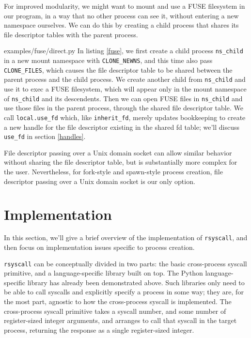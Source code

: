 \documentclass[letterpaper,twocolumn,10pt]{article}
\begin{document}
For improved modularity, we might want to mount and use a FUSE filesystem in our program,
in a way that no other process can see it,
without entering a new namespace ourselves.
We can do this by creating a child process that shares its file descriptor tables with the parent process.


{examples/fuse/direct.py}
In listing \ref{fuse},
we first create a child process \verb|ns_child| in a new mount namespace with \verb|CLONE_NEWNS|,
and this time also pass \verb|CLONE_FILES|,
which causes the file descriptor table to be shared between the parent process and the child process.\cite{clone}
We create another child from \verb|ns_child|
and use it to exec a FUSE filesystem,
which will appear only in the mount namespace of \verb|ns_child| and its descendents.
Then we can open FUSE files in \verb|ns_child|
and use those files in the parent process,
through the shared file descriptor table.
We call \texttt{local.use\_fd} which, like \texttt{inherit\_fd},
merely updates bookkeeping to create a new handle for the file descriptor existing in the shared fd table;
we'll discuss \texttt{use\_fd} in section \ref{handles}.

File descriptor passing over a Unix domain socket
can allow similar behavior without sharing the file descriptor table,
but is substantially more complex for the user.
Nevertheless, for fork-style and spawn-style process creation,
file descriptor passing over a Unix domain socket
is our only option.
\section{Implementation}\label{implementation}
In this section, we'll give a brief overview of the implementation of \texttt{rsyscall},
and then focus on implementation issues specific to process creation.

\texttt{rsyscall} can be conceptually divided in two parts:
the basic cross-process syscall primitive,
and a language-specific library built on top.
The Python language-specific library has already been demonstrated above.
Such libraries only need to be able to call syscalls and explicitly specify a process in some way;
they are, for the most part, agnostic to how the cross-process syscall is implemented.
The cross-process syscall primitive takes a syscall number, and some number of register-sized integer arguments,
and arranges to call that syscall in the target process,
returning the response as a single register-sized integer.
\end{document}
